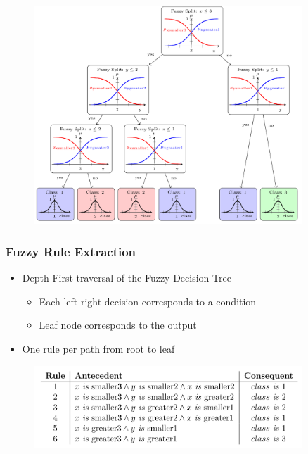 \documentclass[
	10pt,
	t		%
]{beamer}
\begin{document}
\begin{frame}

	\begin{figure}
		\centering
		\includegraphics[width=0.9\textwidth]{figures/fuzzy-decision-tree.png}
	\end{figure}

\end{frame}

\begin{frame}

	\frametitle{Fuzzy Rule Extraction}

	\begin{itemize}
		\item Depth-First traversal of the Fuzzy Decision Tree
		      \begin{itemize}
			      \item Each left-right decision corresponds to a condition
			      \item Leaf node corresponds to the output
		      \end{itemize}
		\item One rule per path from root to leaf
	\end{itemize}

	\begin{figure}
		\centering
		\includegraphics[width=0.9\textwidth]{figures/extracted-rules.png}
	\end{figure}

\end{frame}
\end{document}
